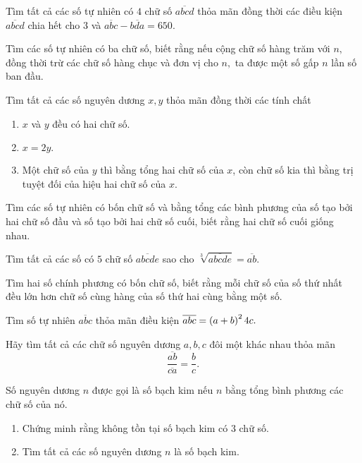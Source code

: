 \begin{btt}
Tìm tất cả các số tự nhiên có $4$ chữ số $\overline{abcd}$ thỏa mãn đồng thời các điều kiện $\overline{abcd}$ chia hết cho $3$ và $\overline{abc}-\overline{bda}=650.$
\end{btt}

\begin{btt}
Tìm các số tự nhiên có ba chữ số, biết rằng nếu cộng chữ số hàng trăm với $n,$ đồng thời trừ các chữ số hàng chục và đơn vị cho $n,$ ta được một số gấp $n$ lần số ban đầu.
\end{btt}

\begin{btt}
Tìm tất cả các số nguyên dương $x,y$ thỏa mãn đồng thời các tính chất
\begin{enumerate}[i,]
    \item $x$ và $y$ đều có hai chữ số.
    \item $x=2 y.$
    \item Một chữ số của $y$ thì bằng tổng hai chữ số của $x$, còn chữ số kia thì bằng trị tuyệt đối của hiệu hai chữ số của $x$.
\end{enumerate}
\end{btt}

\begin{btt}
Tìm các số tự nhiên có bốn chữ số và bằng tổng các bình phương của số tạo bởi hai chữ số đầu và số tạo bởi hai chữ số cuối, biết rằng hai chữ số cuối giống nhau.
\end{btt}

\begin{btt}
Tìm tất cả các số có $5$ chữ số $\overline{abcde}$ sao cho $\sqrt[3]{\overline{abcde}}=\overline{ab}$.
\end{btt}

\begin{btt}
Tìm hai số chính phương có bốn chữ số, biết rằng mỗi chữ số của số thứ nhất đều lớn hơn chữ số cùng hàng của số thứ hai cùng bằng một số.
\end{btt}

\begin{btt}
Tìm số tự nhiên $\overline{abc}$ thỏa mãn điều kiện $\overline{abc}=\left(\displaystyle a+b \right)^24c.$
\end{btt}
\begin{btt}
Hãy tìm tất cả các chữ số nguyên dương $a,b,c$ đôi một khác nhau thỏa mãn 
\[\dfrac{\overline{ab}}{\overline{ca}}=\dfrac{b}{c}.\]
\end{btt}
\begin{btt}
Số nguyên dương $n$ được gọi là số bạch kim nếu $n$ bằng tổng bình phương các chữ số của nó.
\begin{enumerate}[a,]
    \item Chứng minh rằng không tồn tại số bạch kim có $3$ chữ số.
    \item Tìm tất cả các số nguyên dương $n$ là số bạch kim.
\end{enumerate}
\end{btt}


